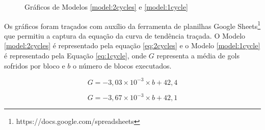 \begin{figure}[!htb]
\centering
    \caption{\label{img:graph} Gráficos de Modelos \ref{model:2cycles} e \ref{model:1cycle}}
    \qquad
    \vspace{1.5em}
\end{figure}

Os gráficos foram traçados com auxílio da ferramenta de planilhas Google Sheets\footnote{https://docs.google.com/spreadsheets} que
permitiu a captura da equação da curva de tendência traçada. O Modelo
\ref{model:2cycles} é representado pela equação \ref{eq:2cycles} e o Modelo
\ref{model:1cycle} é representado pela Equação \ref{eq:1cycle}, onde $G$
representa a média de gols sofridos por bloco e $b$ o número de blocos executados.

\begin{equation}
    \label{eq:2cycles}
    G=-3,03\times 10^{-3}\times b+42,4
\end{equation}

\begin{equation}
    \label{eq:1cycle}
    G=-3,67\times 10^{-3} \times b+42,1
\end{equation}